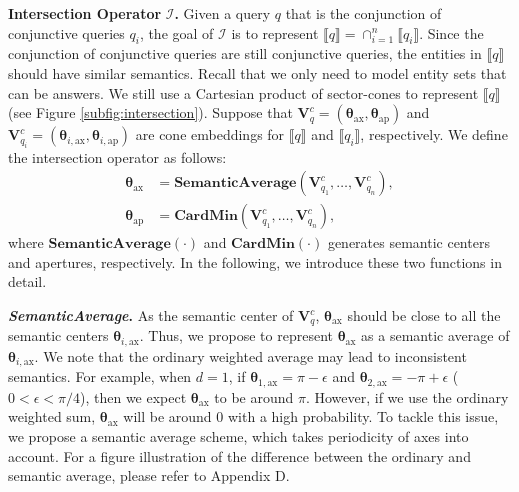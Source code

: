 \documentclass{article}
\newcommand{\gb}[1]{\boldsymbol{#1}}
\newcommand{\taxis}{\text{ax}}
\newcommand{\targ}{\text{ap}}
\begin{document}
\textbf{Intersection Operator} $\mathcal{I}$\textbf{.} Given a query $q$ that is the conjunction of conjunctive queries $q_i$, the goal of $\mathcal{I}$ is to represent $\llbracket q\rrbracket = \cap_{i=1}^n\llbracket q_i\rrbracket$. Since the conjunction of conjunctive queries are still conjunctive queries, the entities in $\llbracket q\rrbracket$ should have similar semantics. Recall that we only need to model entity sets that can be answers. We still use a Cartesian product of sector-cones to represent $\llbracket q\rrbracket$ (see Figure \ref{subfig:intersection}). 
Suppose that $\textbf{V}_q^c=(\gb{\theta}_{\taxis}, \gb{\theta}_{\targ})$ and $\textbf{V}_{q_i}^c=(\gb{\theta}_{i,\taxis}, \gb{\theta}_{i,\targ})$ are cone embeddings for $\llbracket q\rrbracket$ and $\llbracket q_i\rrbracket$, respectively. 
We define the intersection operator as follows:
\begin{align*}
    \gb{\theta}_{\taxis}&=\textbf{SemanticAverage}(\textbf{V}_{q_1}^c,\dots,\textbf{V}_{q_n}^c),\\
   \gb{\theta}_{\targ}&=\textbf{CardMin}(\textbf{V}_{q_1}^c,\dots,\textbf{V}_{q_n}^c),
\end{align*}
where $\textbf{SemanticAverage}(\cdot)$ and $\textbf{CardMin}(\cdot)$ generates semantic centers and apertures, respectively. In the following, we introduce these two functions in detail.

\textbf{\textit{SemanticAverage}.} As the semantic center of $\textbf{V}_q^c$, $\gb{\theta}_{\taxis}$ should be close to all the semantic centers $\gb{\theta}_{i,\taxis}$. Thus, we propose to represent $\gb{\theta}_{\taxis}$ as a semantic average of $\gb{\theta}_{i,\taxis}$. We note that the ordinary weighted average may lead to inconsistent semantics. For example, when $d=1$, if $\gb{\theta}_{1,\taxis}=\pi-\epsilon$ and $\gb{\theta}_{2,\taxis}=-\pi+\epsilon$ ($0<\epsilon<\pi/4$), then we expect $\gb{\theta}_{\taxis}$ to be around $\pi$. However, if we use the ordinary weighted sum, $\gb{\theta}_{\taxis}$ will be around $0$ with a high probability. To tackle this issue, we propose a semantic average scheme, which takes periodicity of axes into account. For a figure illustration of the difference between the ordinary and semantic average, please refer to Appendix D.
\end{document}
